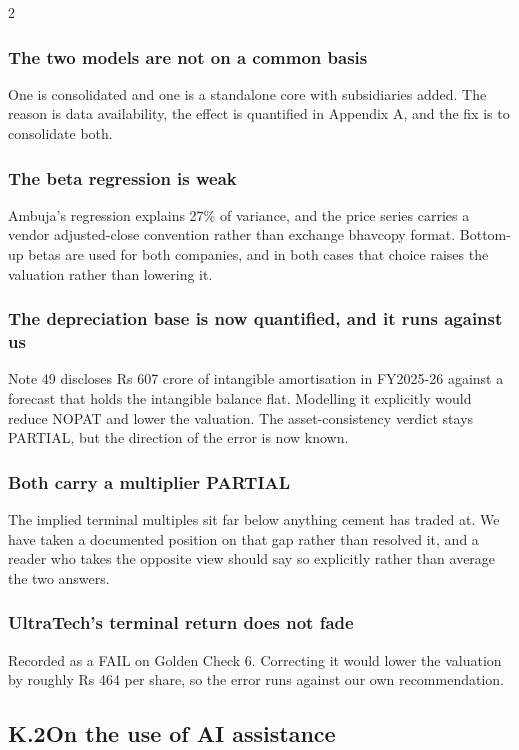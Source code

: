 \begin{paracol}{2}
\subsubsection{The two models are not on a common basis} One is consolidated and one
is a standalone core with subsidiaries added. The reason is data availability, the
effect is quantified in Appendix A, and the fix is to consolidate both.

\subsubsection{The beta regression is weak} Ambuja's regression explains 27\% of
variance, and the price series carries a vendor adjusted-close convention rather than
exchange bhavcopy format. Bottom-up betas are used for both companies, and in both
cases that choice raises the valuation rather than lowering it.

\subsubsection{The depreciation base is now quantified, and it runs against us}
Note 49 discloses Rs 607 crore of intangible amortisation in FY2025-26 against a
forecast that holds the intangible balance flat. Modelling it explicitly would reduce
NOPAT and lower the valuation. The asset-consistency verdict stays PARTIAL, but the
direction of the error is now known.

\subsubsection{Both carry a multiplier PARTIAL} The implied terminal multiples sit far
below anything cement has traded at. We have taken a documented position on that gap
rather than resolved it, and a reader who takes the opposite view should say so
explicitly rather than average the two answers.

\subsubsection{UltraTech's terminal return does not fade} Recorded as a FAIL on Golden
Check 6. Correcting it would lower the valuation by roughly Rs 464 per share, so the
error runs against our own recommendation.

\subsection*{K.2\quad On the use of AI assistance}


\end{paracol}
